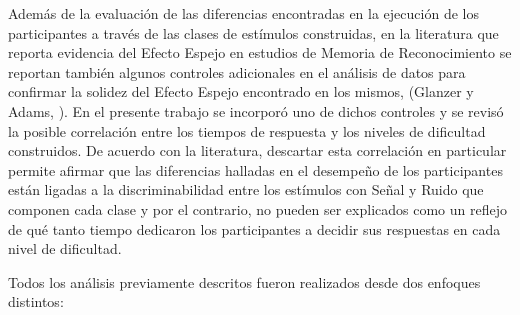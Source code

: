 \begin{enumerate}
Además de la evaluación de las diferencias encontradas en la ejecución de los participantes a través de las clases de estímulos construidas, en la literatura que reporta evidencia del Efecto Espejo en estudios de Memoria de Reconocimiento se reportan también algunos controles adicionales en el análisis de datos para confirmar la solidez del Efecto Espejo encontrado en los mismos, (Glanzer y Adams, \citeyear{Glanzer1990}). En el presente trabajo se incorporó uno de dichos controles y se revisó la posible correlación entre los tiempos de respuesta y los niveles de dificultad construidos. De acuerdo con la literatura, descartar esta correlación en particular permite afirmar que las diferencias halladas en el desempeño de los participantes están ligadas a la discriminabilidad entre los estímulos con Señal y Ruido que componen cada clase y por el contrario, no pueden ser explicados como un reflejo de qué tanto tiempo dedicaron los participantes a decidir sus respuestas en cada nivel de dificultad.\\
\end{enumerate}

Todos los análisis previamente descritos fueron realizados desde dos enfoques distintos:\\

